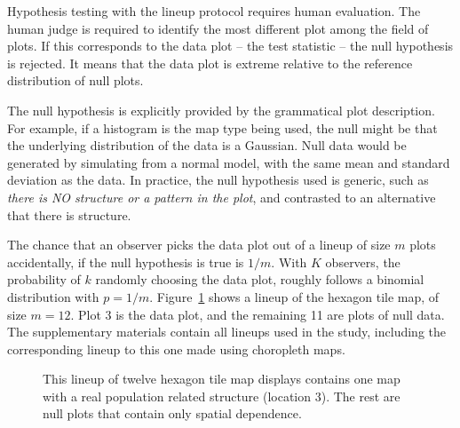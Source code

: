 \documentclass[
doublespace,
  times]{anzsauth}
\begin{document}
Hypothesis testing with the lineup protocol requires human evaluation.
The human judge is required to identify the most different plot among
the field of plots. If this corresponds to the data plot -- the test
statistic -- the null hypothesis is rejected. It means that the data
plot is extreme relative to the reference distribution of null plots.

The null hypothesis is explicitly provided by the grammatical plot
description. For example, if a histogram is the map type being used, the
null might be that the underlying distribution of the data is a
Gaussian. Null data would be generated by simulating from a normal
model, with the same mean and standard deviation as the data. In
practice, the null hypothesis used is generic, such as \emph{there is NO
structure or a pattern in the plot}, and contrasted to an alternative
that there is structure.

The chance that an observer picks the data plot out of a lineup of size
\(m\) plots accidentally, if the null hypothesis is true is \(1/m\).
With \(K\) observers, the probability of \(k\) randomly choosing the
data plot, roughly follows a binomial distribution with \(p=1/m\).
Figure~\ref{fig-lineup} shows a lineup of the hexagon tile map, of size
\(m=12\). Plot 3 is the data plot, and the remaining 11 are plots of
null data. The supplementary materials contain all lineups used in the
study, including the corresponding lineup to this one made using
choropleth maps.

\begin{figure}


\caption{\label{fig-lineup}This lineup of twelve hexagon tile map
displays contains one map with a real population related structure
(location 3). The rest are null plots that contain only spatial
dependence.}

\end{figure}%
\end{document}
